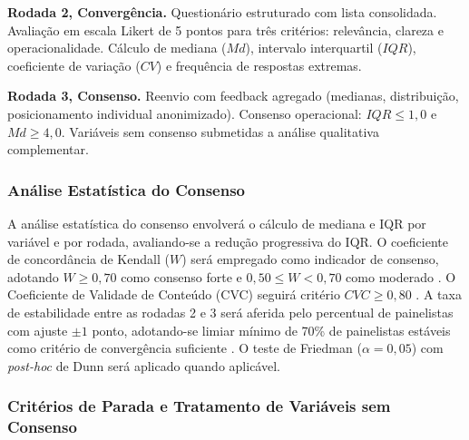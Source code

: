 \textbf{Rodada 2, Convergência.} Questionário estruturado com lista consolidada. Avaliação em escala Likert de 5 pontos para três critérios: relevância, clareza e operacionalidade. Cálculo de mediana ($Md$), intervalo interquartil ($IQR$), coeficiente de variação ($CV$) e frequência de respostas extremas.

\textbf{Rodada 3, Consenso.} Reenvio com feedback agregado (medianas, distribuição, posicionamento individual anonimizado). Consenso operacional: $IQR \leq 1,0$ e $Md \geq 4,0$. Variáveis sem consenso submetidas a análise qualitativa complementar.

\subsubsection{Análise Estatística do Consenso}

A análise estatística do consenso envolverá o cálculo de mediana e IQR por variável e por rodada, avaliando-se a redução progressiva do IQR. O coeficiente de concordância de Kendall ($W$) será empregado como indicador de consenso, adotando $W \geq 0{,}70$ como consenso forte e $0{,}50 \leq W < 0{,}70$ como moderado \cite{Schmidt2014}. O Coeficiente de Validade de Conteúdo (CVC) seguirá critério $CVC \geq 0{,}80$ \cite{Hernandez-Nieto2002}. A taxa de estabilidade entre as rodadas 2 e 3 será aferida pelo percentual de painelistas com ajuste $\pm 1$ ponto, adotando-se limiar mínimo de 70\% de painelistas estáveis como critério de convergência suficiente \cite{Dajani1979}. O teste de Friedman ($\alpha = 0{,}05$) com \textit{post-hoc} de Dunn será aplicado quando aplicável.

\subsubsection{Critérios de Parada e Tratamento de Variáveis sem Consenso}
\label{sec:delphi_parada}

